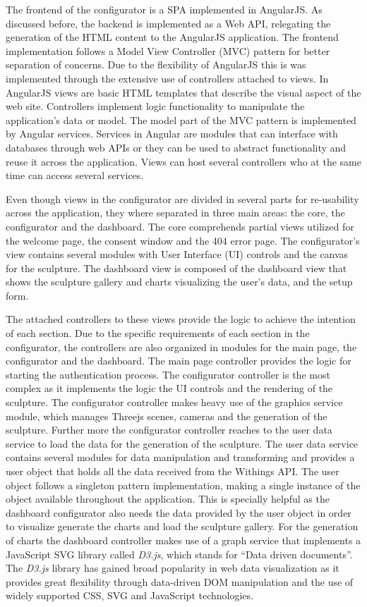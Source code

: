\documentclass[../medieninformatik-arbeit.tex]{subfiles}
\begin{document}
The frontend of the configurator is a SPA implemented in AngularJS. As discussed before, the backend is implemented as a Web API, relegating the generation of the HTML content to the AngularJS application. The frontend implementation follows a Model View Controller (MVC) pattern for better separation of concerns. Due to the flexibility of AngularJS this is was implemented through the extensive use of controllers attached to views. In AngularJS views are basic HTML templates that describe the visual aspect of the web site. Controllers implement logic functionality to manipulate the application's data or model. The model part of the MVC pattern is implemented by Angular services. Services in Angular are modules that can interface with databases through web APIs or they can be used to abstract functionality and reuse it across the application. Views can host several controllers who at the same time can access several services. 

Even though views in the configurator are divided in several parts for re-usability across the application, they where separated in three main areas: the core, the configurator and the dashboard. The core comprehends partial views utilized for the welcome page, the consent window and the 404 error page. The configurator's view contains several modules with User Interface (UI) controls and the canvas for the sculpture. The dashboard view is composed of the dashboard view that shows the sculpture gallery and charts visualizing the user's data, and the setup form. 

The attached controllers to these views provide the logic to achieve the intention of each section. Due to the specific requirements of each section in the configurator, the controllers are also organized in modules for the main page, the configurator and the dashboard. The main page controller provides the logic for starting the authentication process. The configurator controller is the most complex as it implements the logic the UI controls and the rendering of the sculpture. The configurator controller makes heavy use of the graphics service module, which manages Threejs scenes, cameras and the generation of the sculpture. Further more the configurator controller reaches to the user data service to load the data for the generation of the sculpture. The user data service contains several modules for data manipulation and transforming and provides a user object that holds all the data received from the Withings API. The user object follows a singleton pattern implementation, making a single instance of the object available throughout the application. This is specially helpful as the dashboard configurator also needs the data provided by the user object in order to visualize generate the charts and load the sculpture gallery. For the generation of charts the dashboard controller makes use of a graph service that implements a JavaScript SVG library called \textit{D3.js}\cite{bostock2015d3js}, which stands for ``Data driven documents''. The \textit{D3.js} library has gained broad popularity in web data visualization as it provides great flexibility through data-driven DOM manipulation and the use of widely supported CSS, SVG and JavaScript technologies. 
\end{document}
